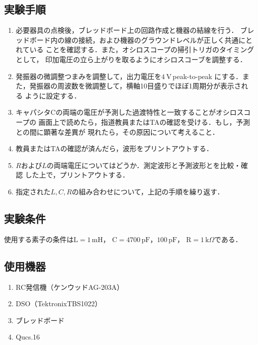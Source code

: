 \subsection{実験手順}    
    \begin{enumerate}
        \item 必要器具の点検後，ブレッドボード上の回路作成と機器の結線を行う．
        ブレッドボード内の線の接続，およひ機器のグラウンドレベルが正しく共通にとれている
        ことを確認する．また，オシロスコープの掃引トリガのタイミングとして，
        印加電圧の立ら上がりを取るようにオシロスコーブを調整する．

        \item  発振器の微調整つまみを調整して，出力電圧を$4 \mathrm{~V}$\,peak-to-peak
        にする．また，発振器の周波数を微調整して，横軸10目盛りでほぼ1周期分が表示される
        ように設定する．

        \item キャパシタCの両端の電圧が予測した過渡特性と一致することがオシロスコープの
        画面上で読めたら，指道教員またはTAの確認を受ける．もし，予測との間に顕著な差異が
        現れたら，その原因について考えること．

        \item 教員またはTAの確認が済んだら，波形をプリントアウトする．

        \item $R$および$L$の両端電圧についてはどうか．測定波形と予測波形とを比較・確認
        した上で，プリントアウトする．

        \item 指定された$L, C, R$の組み合わせについて，上記の手順を繰り返す．
    \end{enumerate}

\newpage

\subsection{実験条件}
使用する素子の条件は$\mathrm{L}=1\,\mathrm{mH}$，
$\mathrm{C}=4700\,\mathrm{pF}，100\,\mathrm{pF}$，
$\mathrm{R}=1\,\mathrm{k}\Omega$である．

\subsection{使用機器}
\begin{enumerate}
    \item RC発信機（ケンウッド\quad AG-203A）
    \item DSO（Tektronix\quad TBS1022）
    \item ブレッドボード
    \item Qucs.16
\end{enumerate}